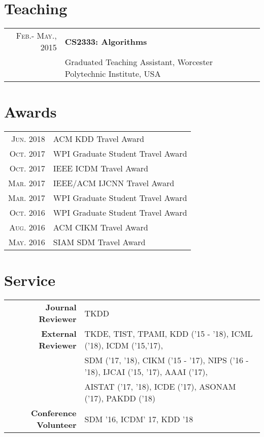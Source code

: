 \documentclass[a4paper,10pt]{article} %
\begin{document}
\section{Teaching}
\begin{tabular}{rl}	
\textsc{Feb.- May., 2015} & \textbf{CS2333: Algorithms}  \\
& Graduated Teaching Assistant, Worcester Polytechnic Institute, USA\\
\end{tabular}

\section{Awards}
\begin{tabular}{rl}
\textsc{Jun.} 2018 & ACM KDD Travel Award \normalsize\\
\textsc{Oct.} 2017 & WPI Graduate Student Travel Award \normalsize\\
\textsc{Oct.} 2017 & IEEE ICDM Travel Award  \normalsize \\
\textsc{Mar.} 2017 & IEEE/ACM IJCNN Travel Award \normalsize \\
\textsc{Mar.} 2017 & WPI Graduate Student Travel Award \normalsize\\
\textsc{Oct.} 2016 & WPI Graduate Student Travel Award \normalsize\\
\textsc{Aug.} 2016 & ACM CIKM Travel Award \normalsize\\
\textsc{May.} 2016 & SIAM SDM Travel Award \normalsize\\
\end{tabular}

\section{Service}
\begin{tabular}{rl}	
\textbf{Journal Reviewer} & TKDD  \\
\textbf{External Reviewer} & TKDE, TIST, TPAMI, KDD ('15 - '18), ICML ('18), ICDM ('15,'17), \\
    & SDM ('17, '18), CIKM ('15 - '17), NIPS ('16 - '18), IJCAI ('15, '17), AAAI ('17),\\
    & AISTAT ('17, '18), ICDE ('17), ASONAM ('17), PAKDD ('18) \\
\textbf{Conference Volunteer} & SDM '16, ICDM' 17, KDD '18
\end{tabular}
\end{document}
